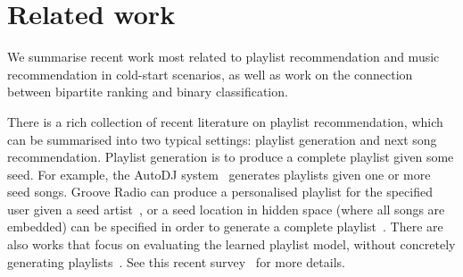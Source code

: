 \section{Related work}

We summarise recent work most related to playlist recommendation and music recommendation in cold-start 
scenarios,
as well as work on the connection between bipartite ranking and binary classification.

There is a rich collection of recent literature on playlist recommendation,
which can be summarised into two typical settings: 
playlist generation and next song recommendation. %
Playlist generation is to produce a complete playlist given some 
seed. %
For example, the AutoDJ system~\cite{platt2002learning} generates playlists given one or more seed songs.
Groove Radio can produce a personalised playlist for the specified user given a seed artist~\cite{ben2017groove},
or a seed location in hidden space (where all songs are embedded)
can be specified in order to generate a complete playlist~\cite{chen2012playlist}.
There are also works that focus on evaluating the learned playlist model,
without concretely generating playlists~\cite{mcfee2011natural,mcfee2012hypergraph}.
See this recent survey~\cite{bonnin2015automated} for more details.

